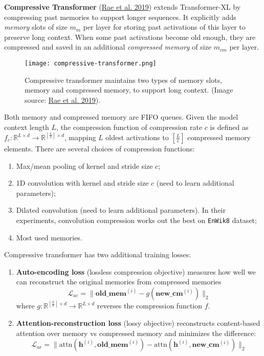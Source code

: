 \documentclass[12pt]{article}
\begin{document}
\textbf{Compressive Transformer} (\href{https://arxiv.org/abs/1911.05507}{Rae et al. 2019}) extends Transformer-XL by compressing past memories to support longer sequences. It explicitly adds \emph{memory} slots of size $m_m$ per layer for storing past activations of this layer to preserve long context. When some past activations become old enough, they are compressed and saved in an additional \emph{compressed memory} of size $m_{cm}$ per layer.

\begin{figure}[h!]
    \centering
    \texttt{[image: compressive-transformer.png]}
    \caption{Compressive transformer maintains two types of memory slots, memory and compressed memory, to support long context. (Image source: \href{https://arxiv.org/abs/1911.05507}{Rae et al. 2019}).}
\end{figure}

Both memory and compressed memory are FIFO queues. Given the model context length $L$, the compression function of compression rate $c$ is defined as $f_c: \mathbb{R}^{L \times d} \to \mathbb{R}^{[\frac{L}{c}] \times d}$, mapping $L$ oldest activations to $[\frac{L}{c}]$ compressed memory elements. There are several choices of compression functions:
\begin{enumerate}
    \item Max/mean pooling of kernel and stride size $c$;
    \item 1D convolution with kernel and stride size $c$ (need to learn additional parameters);
    \item Dilated convolution (need to learn additional parameters). In their experiments, convolution compression works out the best on \texttt{EnWik8} dataset;
    \item Most used memories.
\end{enumerate}

Compressive transformer has two additional training losses:
\begin{enumerate}
    \item \textbf{Auto-encoding loss} (lossless compression objective) measures how well we can reconstruct the original memories from compressed memories
    \[
    \mathcal{L}_{ac} = \| \textbf{old\_mem}^{(i)} - g(\textbf{new\_cm}^{(i)}) \|_2
    \]
    where $g: \mathbb{R}^{[\frac{L}{c}] \times d} \to \mathbb{R}^{L \times d}$ reverses the compression function $f$.
    \item \textbf{Attention-reconstruction loss} (lossy objective) reconstructs content-based attention over memory vs compressed memory and minimizes the difference:
    \[
    \mathcal{L}_{ar} = \|\text{attn}(\mathbf{h}^{(i)}, \textbf{old\_mem}^{(i)}) − \text{attn}(\mathbf{h}^{(i)}, \textbf{new\_cm}^{(i)})\|_2
    \]
\end{enumerate}
\end{document}
